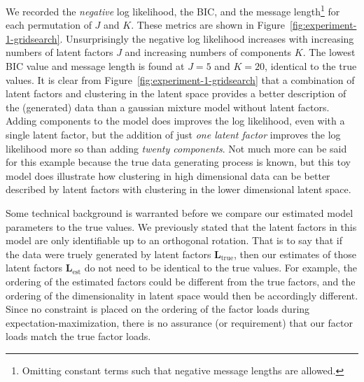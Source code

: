 \documentclass[twocolumn]{aastex62}
\newcommand{\factorloads}{\textbf{L}}
\newcommand{\NumLatentFactors}{J}
\newcommand{\NumComponents}{K}
\begin{document}
We recorded the \emph{negative} log likelihood, the BIC, and the message length\footnote{Omitting constant terms such that negative message lengths are allowed.}  for each permutation of $\NumLatentFactors$ and $\NumComponents$.
These metrics are shown in Figure~\ref{fig:experiment-1-gridsearch}.
Unsurprisingly the negative log likelihood increases with increasing numbers of latent
factors $\NumLatentFactors$ and increasing numbers of components $\NumComponents$.
The lowest BIC value and message length is found at $\NumLatentFactors = 5$
and $\NumComponents = 20$, identical to the true values.
It is clear from Figure~\ref{fig:experiment-1-gridsearch} that a combination of latent factors
and clustering in the latent space provides a better description of the (generated) data than a gaussian mixture model without latent factors.
Adding components to the model does improves the log likelihood, even with a single latent factor,
but the addition of just \emph{one latent factor} improves the log likelihood more so than adding
\emph{twenty components}. Not much more can be said for this example because the true data generating process 
is known, but this toy model does illustrate how 
clustering in high dimensional data can be better described by latent factors with 
clustering in the lower dimensional latent space.





Some technical background is warranted before we compare our estimated model
parameters to the true values. We previously stated that the latent factors in this model are only
identifiable up to an orthogonal rotation. That is to say that
if the data were truely generated by latent factors $\factorloads_\textrm{true}$,
then our estimates of those latent factors $\factorloads_\textrm{est}$ do not need
to be identical to the true values. For example, the ordering of the estimated factors
could be different from the true factors, and the ordering of the dimensionality
in latent space would then be accordingly different. Since no constraint is
placed on the ordering of the factor loads during expectation-maximization,
there is no assurance (or requirement) that our factor loads match the true factor loads.
\end{document}
